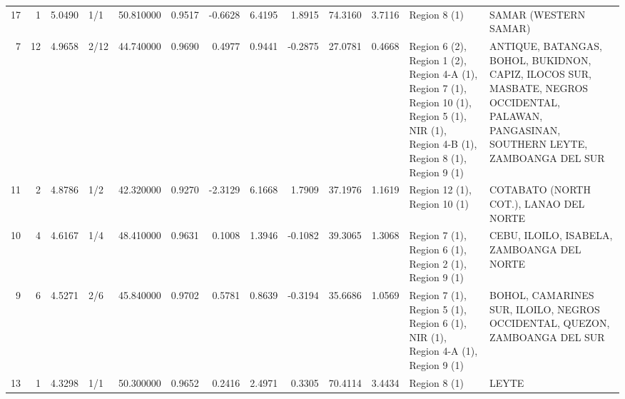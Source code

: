 \begin{tabular}{rrrlrrrrrrrll}
17 & 1 & {\cellcolor[HTML]{BBD1F8}} \color[HTML]{000000} 5.0490 & 1/1 & {\cellcolor[HTML]{B40426}} \color[HTML]{F1F1F1} 50.810000 & 0.9517 & -0.6628 & 6.4195 & 1.8915 & 74.3160 & 3.7116 & Region 8 (1) & SAMAR (WESTERN SAMAR) \\
7 & 12 & {\cellcolor[HTML]{ADC9FD}} \color[HTML]{000000} 4.9658 & 2/12 & {\cellcolor[HTML]{F7A98B}} \color[HTML]{000000} 44.740000 & 0.9690 & 0.4977 & 0.9441 & -0.2875 & 27.0781 & 0.4668 & Region 6 (2), Region 1 (2), Region 4-A (1), Region 7 (1), Region 10 (1), Region 5 (1), NIR (1), Region 4-B (1), Region 8 (1), Region 9 (1) & ANTIQUE, BATANGAS, BOHOL, BUKIDNON, CAPIZ, ILOCOS SUR, MASBATE, NEGROS OCCIDENTAL, PALAWAN, PANGASINAN, SOUTHERN LEYTE, ZAMBOANGA DEL SUR \\
11 & 2 & {\cellcolor[HTML]{9DBDFF}} \color[HTML]{000000} 4.8786 & 1/2 & {\cellcolor[HTML]{F1CDBA}} \color[HTML]{000000} 42.320000 & 0.9270 & -2.3129 & 6.1668 & 1.7909 & 37.1976 & 1.1619 & Region 12 (1), Region 10 (1) & COTABATO (NORTH COT.), LANAO DEL NORTE \\
10 & 4 & {\cellcolor[HTML]{6B8DF0}} \color[HTML]{F1F1F1} 4.6167 & 1/4 & {\cellcolor[HTML]{DA5A49}} \color[HTML]{F1F1F1} 48.410000 & 0.9631 & 0.1008 & 1.3946 & -0.1082 & 39.3065 & 1.3068 & Region 7 (1), Region 6 (1), Region 2 (1), Region 9 (1) & CEBU, ILOILO, ISABELA, ZAMBOANGA DEL NORTE \\
9 & 6 & {\cellcolor[HTML]{5B7AE5}} \color[HTML]{F1F1F1} 4.5271 & 2/6 & {\cellcolor[HTML]{F39577}} \color[HTML]{000000} 45.840000 & 0.9702 & 0.5781 & 0.8639 & -0.3194 & 35.6686 & 1.0569 & Region 7 (1), Region 5 (1), Region 6 (1), NIR (1), Region 4-A (1), Region 9 (1) & BOHOL, CAMARINES SUR, ILOILO, NEGROS OCCIDENTAL, QUEZON, ZAMBOANGA DEL SUR \\
13 & 1 & {\cellcolor[HTML]{3B4CC0}} \color[HTML]{F1F1F1} 4.3298 & 1/1 & {\cellcolor[HTML]{BD1F2D}} \color[HTML]{F1F1F1} 50.300000 & 0.9652 & 0.2416 & 2.4971 & 0.3305 & 70.4114 & 3.4434 & Region 8 (1) & LEYTE \\
\bottomrule
\end{tabular}
